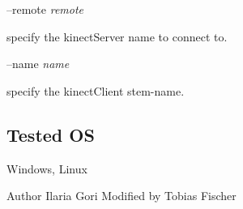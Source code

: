 --remote {\itshape remote} 
\begin{DoxyItemize}
\item specify the kinect\+Server name to connect to.
\end{DoxyItemize}

--name {\itshape name} 
\begin{DoxyItemize}
\item specify the kinect\+Client stem-\/name.
\end{DoxyItemize}\hypertarget{group__kinectServer_tested_os_sec}{}\subsection{Tested OS}\label{group__kinectServer_tested_os_sec}
Windows, Linux

\begin{DoxyAuthor}{Author}
Ilaria Gori Modified by Tobias Fischer 
\end{DoxyAuthor}
